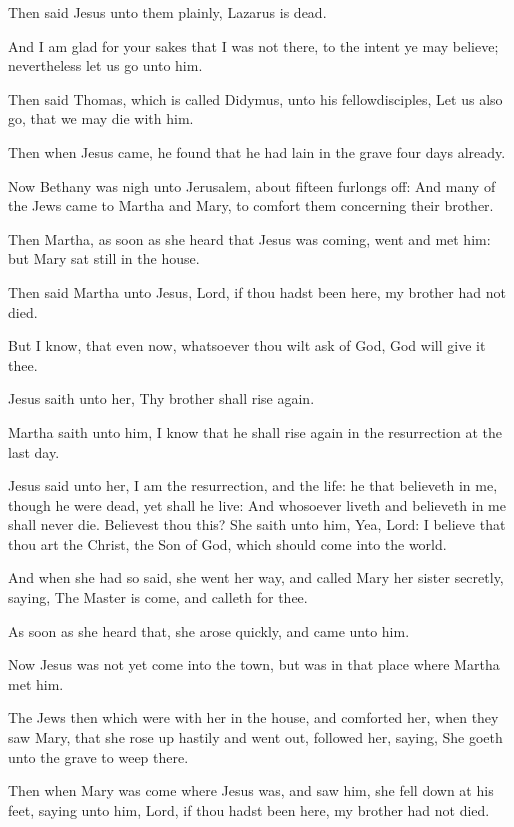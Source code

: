 \verse Then said Jesus unto them plainly, Lazarus is dead.

\verse And I am glad for your sakes that I was not there, to the intent ye may believe; nevertheless let us go unto him.

\verse Then said Thomas, which is called Didymus, unto his fellowdisciples, Let us also go, that we may die with him.

\verse Then when Jesus came, he found that he had lain in the grave four days already.

\verse Now Bethany was nigh unto Jerusalem, about fifteen furlongs off: \verse And many of the Jews came to Martha and Mary, to comfort them concerning their brother.

\verse Then Martha, as soon as she heard that Jesus was coming, went and met him: but Mary sat still in the house.

\verse Then said Martha unto Jesus, Lord, if thou hadst been here, my brother had not died.

\verse But I know, that even now, whatsoever thou wilt ask of God, God will give it thee.

\verse Jesus saith unto her, Thy brother shall rise again.

\verse Martha saith unto him, I know that he shall rise again in the resurrection at the last day.

\verse Jesus said unto her, I am the resurrection, and the life: he that believeth in me, though he were dead, yet shall he live: \verse And whosoever liveth and believeth in me shall never die. Believest thou this?  \verse She saith unto him, Yea, Lord: I believe that thou art the Christ, the Son of God, which should come into the world.

\verse And when she had so said, she went her way, and called Mary her sister secretly, saying, The Master is come, and calleth for thee.

\verse As soon as she heard that, she arose quickly, and came unto him.

\verse Now Jesus was not yet come into the town, but was in that place where Martha met him.

\verse The Jews then which were with her in the house, and comforted her, when they saw Mary, that she rose up hastily and went out, followed her, saying, She goeth unto the grave to weep there.

\verse Then when Mary was come where Jesus was, and saw him, she fell down at his feet, saying unto him, Lord, if thou hadst been here, my brother had not died.

